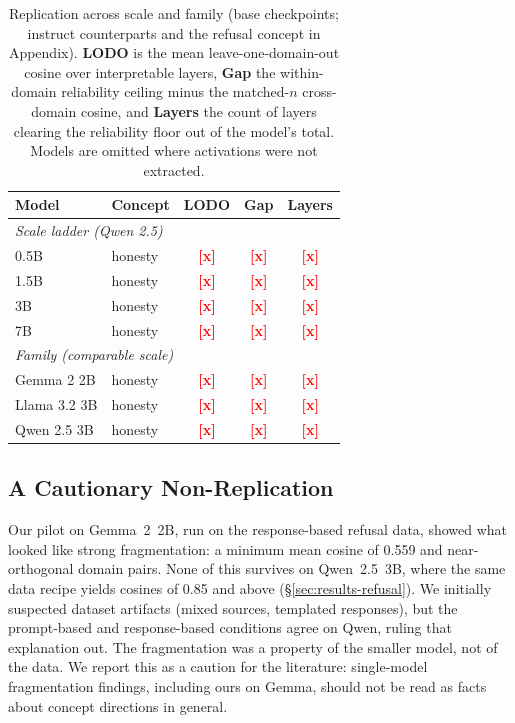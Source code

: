 \documentclass[11pt]{article}
\newcommand{\PH}[1]{\textcolor{red}{\textbf{[#1]}}}
\begin{document}
\begin{table}[t]
  \centering
  \small
  \begin{tabular}{llccc}
    \toprule
    \textbf{Model} & \textbf{Concept} & \textbf{LODO} & \textbf{Gap} & \textbf{Layers} \\
    \midrule
    \multicolumn{5}{l}{\textit{Scale ladder (Qwen 2.5)}} \\
    0.5B & honesty & \PH{x} & \PH{x} & \PH{x} \\
    1.5B & honesty & \PH{x} & \PH{x} & \PH{x} \\
    3B   & honesty & \PH{x} & \PH{x} & \PH{x} \\
    7B   & honesty & \PH{x} & \PH{x} & \PH{x} \\
    \midrule
    \multicolumn{5}{l}{\textit{Family (comparable scale)}} \\
    Gemma 2 2B   & honesty & \PH{x} & \PH{x} & \PH{x} \\
    Llama 3.2 3B & honesty & \PH{x} & \PH{x} & \PH{x} \\
    Qwen 2.5 3B  & honesty & \PH{x} & \PH{x} & \PH{x} \\
    \bottomrule
  \end{tabular}
  \caption{Replication across scale and family (base checkpoints; instruct
  counterparts and the refusal concept in Appendix). \textbf{LODO} is the mean
  leave-one-domain-out cosine over interpretable layers, \textbf{Gap} the
  within-domain reliability ceiling minus the matched-$n$ cross-domain cosine,
  and \textbf{Layers} the count of layers clearing the reliability floor out of
  the model's total. Models are omitted where activations were not extracted.}
  \label{tab:replication}
\end{table}

\subsection{A Cautionary Non-Replication}
\label{sec:results-pilot}

Our pilot on Gemma~2~2B, run on the response-based refusal data, showed what
looked like strong fragmentation: a minimum mean cosine of 0.559 and
near-orthogonal domain pairs. None of this survives on Qwen~2.5~3B, where
the same data recipe yields cosines of 0.85 and above
(\S\ref{sec:results-refusal}).
We initially suspected dataset artifacts (mixed sources, templated
responses), but the prompt-based and response-based conditions agree on
Qwen, ruling that explanation out. The fragmentation was a property of the
smaller model, not of the data. We report this as a caution for the
literature: single-model fragmentation findings, including ours on Gemma,
should not be read as facts about concept directions in general.
\end{document}
